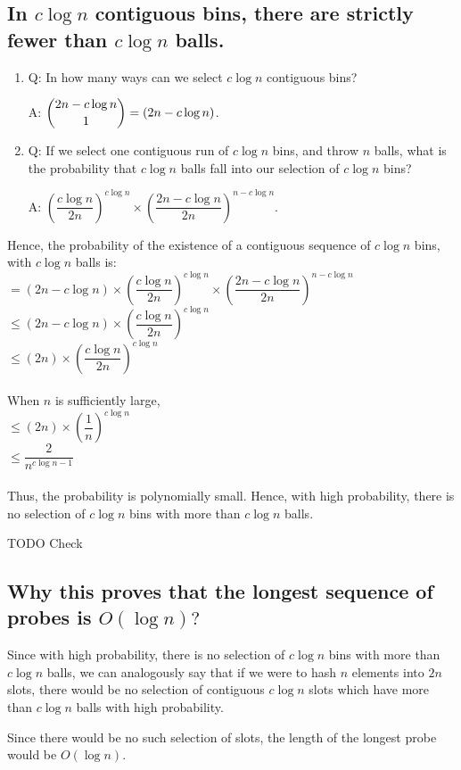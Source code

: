 \documentclass{article}
\begin{document}
\subsection{In $c\log{n}$ contiguous bins, there are strictly
fewer than $c\log{n}$ balls.}
\begin{enumerate}

\item Q: In how many ways can we select $c\log{n}$ contiguous bins?

  A: $\dbinom{2n-c\log{n}}{1}  = (2n-c\log{n})$.

\item Q: If we select one contiguous run of $c\log{n}$ bins, and throw
  $n$ balls, what is the probability that $c\log{n}$ balls fall into
  our selection of $c\log{n}$ bins?

  A: $\left(\dfrac{c\log{n}}{2n}\right)^{c\log{n}} \times 
  \left( \dfrac{2n-c\log{n}}{2n} \right) ^{n-c\log{n}}$.

\end{enumerate}

Hence, the probability of the existence of a contiguous
sequence of $c\log{n}$ bins, with $c\log{n}$ balls is: \\
$ = (2n-c\log{n}) \times \left(\dfrac{c\log{n}}{2n}\right)^{c\log{n}} \times 
\left( \dfrac{2n-c\log{n}}{2n} \right) ^{n-c\log{n}}$ \\
$ \leq (2n-c\log{n}) \times \left(\dfrac{c\log{n}}{2n}\right)^{c\log{n}}$ \\
$ \leq (2n) \times \left( \dfrac{c\log{n}}{2n}\right)^{c\log{n}} $ \\
\\ When $n$ is sufficiently large, \\
$ \leq (2n) \times \left( \dfrac{1}{n} \right)^{c\log{n}}$ \\
$ \leq \dfrac{2}{n^{c\log{n}-1}} $ \\
\\ Thus, the probability is polynomially small. Hence, with high
probability, there is no selection of $c\log{n}$ bins with
more than $c\log{n}$ balls.

TODO Check

\subsection{Why this proves that the longest sequence of probes
is $O(\log{n})?$}


Since with high probability, there is no selection of $c\log{n}$ bins
with more than $c\log{n}$ balls, we can analogously say that if we
were to hash $n$ elements into $2n$ slots, there would be no selection of contiguous $c\log{n}$ slots which have
more than $c\log{n}$ balls with high probability.

Since there would be no such selection of slots, the length of the
longest probe would be $O(\log{n})$.

\clearpage
\end{document}
